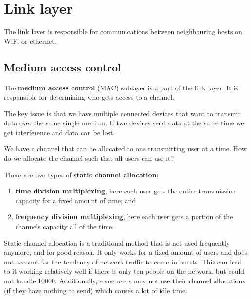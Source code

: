 \chapter{Link layer}

The link layer is responsible for communications between neighbouring hosts on WiFi or ethernet. 

\section{Medium access control}

\begin{definition}
    The \textbf{medium access control} (MAC) sublayer is a part of the link layer. It is responsible for determining who gets access to a channel.
\end{definition}

The key issue is that we have multiple connected devices that want to transmit data over the same single medium. If two devices send data at the same time we get interference and data can be lost.

\begin{problem}
    We have a channel that can be allocated to one transmitting user at a time. How do we allocate the channel such that all users can use it?
\end{problem}

\begin{definition}
    There are two types of \textbf{static channel allocation}:
    \begin{enumerate}
        \item \textbf{time division multiplexing}, here each user gets the entire transmission capacity for a fixed amount of time; and
        \item \textbf{frequency division multiplexing}, here each user gets a portion of the channels capacity all of the time.
    \end{enumerate}
\end{definition}

Static channel allocation is a traditional method that is not used frequently anymore, and for good reason. It only works for a fixed amount of users and does not account for the tendency of network traffic to come in bursts. This can lead to it working relatively well if there is only ten people on the network, but could not handle 10000. Additionally, some users may not use their channel allocations (if they have nothing to send) which causes a lot of idle time.

